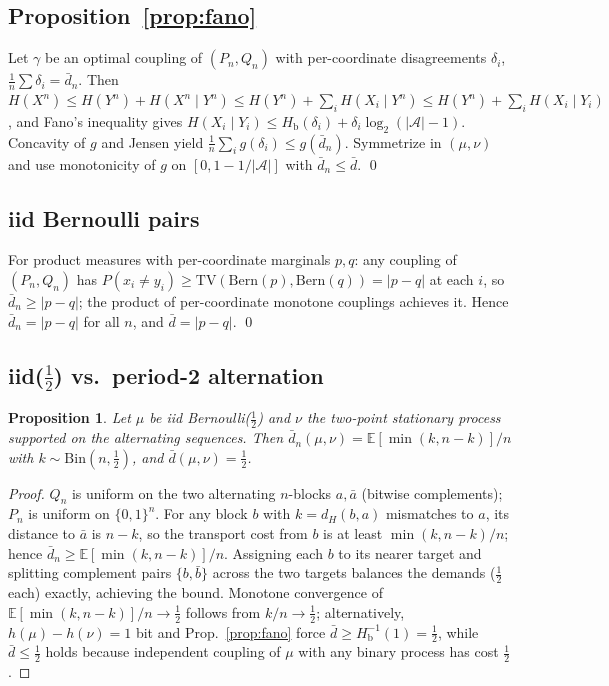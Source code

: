 \documentclass[11pt]{article}
\newtheorem{proposition}{Proposition}[section]
\newcommand{\dbar}{\bar d}
\newcommand{\Hb}{H_{\mathrm b}}
\newcommand{\E}{\mathbb E}
\newcommand{\A}{\mathcal A}
\begin{document}
\subsection{Proposition~\ref{prop:fano}}
Let $\gamma$ be an optimal coupling of $(P_n,Q_n)$ with per-coordinate disagreements
$\delta_i$, $\frac1n\sum\delta_i=\dbar_n$. Then
$H(X^n)\le H(Y^n)+H(X^n\mid Y^n)\le H(Y^n)+\sum_i H(X_i\mid Y^n)
\le H(Y^n)+\sum_i H(X_i\mid Y_i)$,
and Fano's inequality gives $H(X_i\mid Y_i)\le \Hb(\delta_i)+\delta_i\log_2(|\A|-1)$.
Concavity of $g$ and Jensen yield $\frac1n\sum_i g(\delta_i)\le g(\dbar_n)$. Symmetrize
in $(\mu,\nu)$ and use monotonicity of $g$ on $[0,1-1/|\A|]$ with
$\dbar_n\le\dbar$. \qed

\subsection{iid Bernoulli pairs}
For product measures with per-coordinate marginals $p,q$: any coupling of $(P_n,Q_n)$
has $P(x_i\ne y_i)\ge \mathrm{TV}(\mathrm{Bern}(p),\mathrm{Bern}(q))=|p-q|$ at each
$i$, so $\dbar_n\ge|p-q|$; the product of per-coordinate monotone couplings achieves
it. Hence $\dbar_n=|p-q|$ for all $n$, and $\dbar=|p-q|$. \qed

\subsection{iid($\tfrac12$) vs.\ period-2 alternation}\label{app:alt}
\begin{proposition}\label{prop:alt}
Let $\mu$ be iid Bernoulli($\tfrac12$) and $\nu$ the two-point stationary process
supported on the alternating sequences. Then
$\dbar_n(\mu,\nu)=\E[\min(k,n-k)]/n$ with $k\sim\mathrm{Bin}(n,\tfrac12)$, and
$\dbar(\mu,\nu)=\tfrac12$.
\end{proposition}
\begin{proof}
$Q_n$ is uniform on the two alternating $n$-blocks $a,\bar a$ (bitwise complements);
$P_n$ is uniform on $\{0,1\}^n$. For any block $b$ with $k=d_H(b,a)$ mismatches to $a$,
its distance to $\bar a$ is $n-k$, so the transport cost from $b$ is at least
$\min(k,n-k)/n$; hence $\dbar_n\ge\E[\min(k,n-k)]/n$. Assigning each $b$ to its nearer
target and splitting complement pairs $\{b,\bar b\}$ across the two targets balances
the demands ($\tfrac12$ each) exactly, achieving the bound. Monotone convergence of
$\E[\min(k,n-k)]/n\to\tfrac12$ follows from $k/n\to\tfrac12$; alternatively,
$h(\mu)-h(\nu)=1$ bit and Prop.~\ref{prop:fano} force $\dbar\ge\Hb^{-1}(1)=\tfrac12$,
while $\dbar\le\tfrac12$ holds because independent coupling of $\mu$ with any binary
process has cost $\tfrac12$.
\end{proof}
\end{document}
